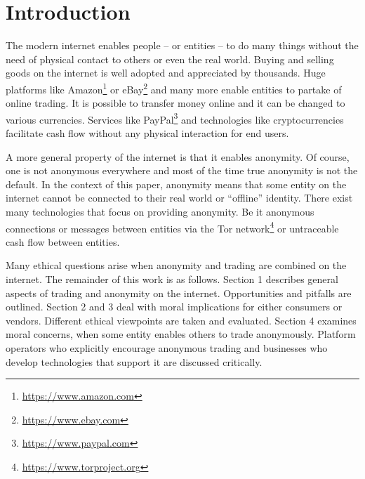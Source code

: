 \section{Introduction}


The modern internet enables people -- or entities -- to do many things without the need of physical contact to others or even the real world. Buying and selling goods on the internet is well adopted and appreciated by thousands. Huge platforms like Amazon\footnote{\url{https://www.amazon.com}} or eBay\footnote{\url{https://www.ebay.com}} and many more enable entities to partake of online trading. It is possible to transfer money online and it can be changed to various currencies. Services like PayPal\footnote{\url{https://www.paypal.com}} and technologies like cryptocurrencies facilitate cash flow without any physical interaction for end users.

A more general property of the internet is that it enables anonymity. Of course, one is not anonymous everywhere and most of the time true anonymity is not the default. In the context of this paper, anonymity means that some entity on the internet cannot be connected to their real world or ``offline'' identity. There exist many technologies that focus on providing anonymity. Be it anonymous connections or messages between entities via the Tor network\footnote{\url{https://www.torproject.org}} or untraceable cash flow between entities.

Many ethical questions arise when anonymity and trading are combined on the internet. The remainder of this work is as follows. Section 1 describes general aspects of trading and anonymity on the internet. Opportunities and pitfalls are outlined. Section 2 and 3 deal with moral implications for either consumers or vendors. Different ethical viewpoints are taken and evaluated. Section 4 examines moral concerns, when some entity enables others to trade anonymously. Platform operators who explicitly encourage anonymous trading and businesses who develop technologies that support it are discussed critically.